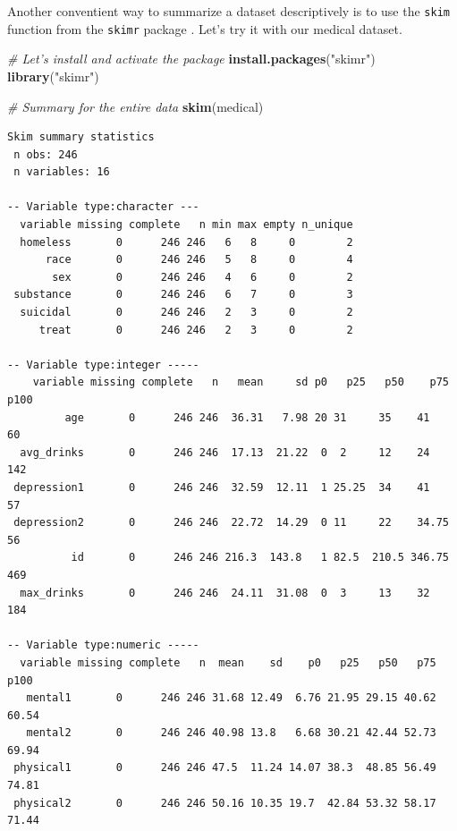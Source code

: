 \documentclass[]{book}
\newenvironment{Shaded}{\begin{snugshade}}{\end{snugshade}}
\newcommand{\CommentTok}[1]{\textcolor[rgb]{0.56,0.35,0.01}{\textit{#1}}}
\newcommand{\KeywordTok}[1]{\textcolor[rgb]{0.13,0.29,0.53}{\textbf{#1}}}
\newcommand{\NormalTok}[1]{#1}
\newcommand{\StringTok}[1]{\textcolor[rgb]{0.31,0.60,0.02}{#1}}
\begin{document}
Another conventient way to summarize a dataset descriptively is to use the \texttt{skim} function from the \texttt{skimr} package \citep{R-skimr}. Let's try it with our medical dataset.

\begin{Shaded}
\begin{Highlighting}[]
\CommentTok{# Let's install and activate the package}
\KeywordTok{install.packages}\NormalTok{(}\StringTok{"skimr"}\NormalTok{)}
\KeywordTok{library}\NormalTok{(}\StringTok{"skimr"}\NormalTok{)}
\end{Highlighting}
\end{Shaded}

\begin{Shaded}
\begin{Highlighting}[]
\CommentTok{# Summary for the entire data}
\KeywordTok{skim}\NormalTok{(medical)}
\end{Highlighting}
\end{Shaded}

\begin{verbatim}
Skim summary statistics
 n obs: 246 
 n variables: 16 

-- Variable type:character ---
  variable missing complete   n min max empty n_unique
  homeless       0      246 246   6   8     0        2
      race       0      246 246   5   8     0        4
       sex       0      246 246   4   6     0        2
 substance       0      246 246   6   7     0        3
  suicidal       0      246 246   2   3     0        2
     treat       0      246 246   2   3     0        2

-- Variable type:integer -----
    variable missing complete   n   mean     sd p0   p25   p50    p75 p100
         age       0      246 246  36.31   7.98 20 31     35    41      60
  avg_drinks       0      246 246  17.13  21.22  0  2     12    24     142
 depression1       0      246 246  32.59  12.11  1 25.25  34    41      57
 depression2       0      246 246  22.72  14.29  0 11     22    34.75   56
          id       0      246 246 216.3  143.8   1 82.5  210.5 346.75  469
  max_drinks       0      246 246  24.11  31.08  0  3     13    32     184

-- Variable type:numeric -----
  variable missing complete   n  mean    sd    p0   p25   p50   p75  p100
   mental1       0      246 246 31.68 12.49  6.76 21.95 29.15 40.62 60.54
   mental2       0      246 246 40.98 13.8   6.68 30.21 42.44 52.73 69.94
 physical1       0      246 246 47.5  11.24 14.07 38.3  48.85 56.49 74.81
 physical2       0      246 246 50.16 10.35 19.7  42.84 53.32 58.17 71.44
\end{verbatim}
\end{document}
